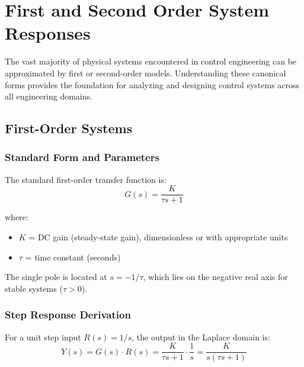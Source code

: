
\chapter{First and Second Order System Responses}
\label{ch:standard_responses}

The vast majority of physical systems encountered in control engineering can be approximated by first or second-order models. Understanding these canonical forms provides the foundation for analyzing and designing control systems across all engineering domains.

\section{First-Order Systems}
\label{sec:first_order}

\subsection{Standard Form and Parameters}

The standard first-order transfer function is:
\begin{equation}
G(s) = \frac{K}{\tau s + 1}
\label{eq:first_order_tf}
\end{equation}

where:
\begin{itemize}
    \item $K$ = DC gain (steady-state gain), dimensionless or with appropriate units
    \item $\tau$ = time constant (seconds)
\end{itemize}

The single pole is located at $s = -1/\tau$, which lies on the negative real axis for stable systems ($\tau > 0$).

\subsection{Step Response Derivation}

For a unit step input $R(s) = 1/s$, the output in the Laplace domain is:
\begin{equation}
Y(s) = G(s) \cdot R(s) = \frac{K}{\tau s + 1} \cdot \frac{1}{s} = \frac{K}{s(\tau s + 1)}
\end{equation}

